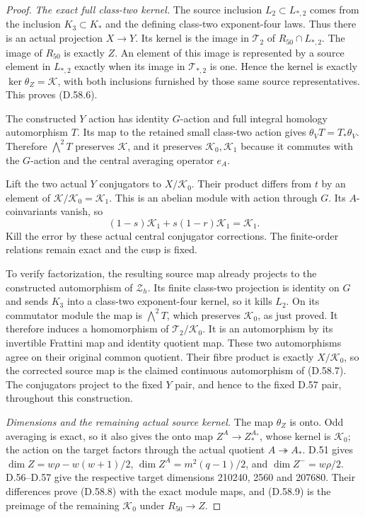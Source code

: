 \begin{proof}
\emph{The exact full class-two kernel.}
The source inclusion \(L_2\subset L_{*,2}\)
comes from the inclusion \(K_3\subset K_*\)
and the defining class-two exponent-four laws.
Thus there is an actual projection \(X\to Y\).
Its kernel is the image in \(\mathcal T_2\)
of \(R_{50}\cap L_{*,2}\). The image of
\(R_{50}\) is exactly \(Z\). An element of
this image is represented by a source element
in \(L_{*,2}\) exactly when its image in
\(\mathcal T_{*,2}\) is one. Hence the kernel
is exactly \(\ker\theta_Z=\mathcal K\), with
both inclusions furnished by those same
source representatives. This proves (D.58.6).

The constructed \(Y\) action has identity
\(G\)-action and full integral homology
automorphism \(T\). Its map to the retained
small class-two action gives
\(\theta_VT=T_*\theta_V\). Therefore
\(\bigwedge^2T\) preserves \(\mathcal K\),
and it preserves \(\mathcal K_0,\mathcal K_1\)
because it commutes with the \(G\)-action
and the central averaging operator \(e_A\).

Lift the two actual \(Y\) conjugators to
\(X/\mathcal K_0\). Their product differs
from \(t\) by an element of
\(\mathcal K/\mathcal K_0=\mathcal K_1\).
This is an abelian module with action through
\(G\). Its \(A\)-coinvariants vanish, so
\[
 (1-s)\mathcal K_1+s(1-r)\mathcal K_1
                         =\mathcal K_1.
 \tag{D.58.17}
\]
Kill the error by these actual central
conjugator corrections. The finite-order
relations remain exact and the cusp is fixed.

To verify factorization, the resulting source
map already projects to the constructed
automorphism of \(\mathcal Z_h\). Its finite
class-two projection is identity on \(G\)
and sends \(K_3\) into a class-two
exponent-four kernel, so it kills \(L_2\).
On its commutator module the map is
\(\bigwedge^2T\), which preserves
\(\mathcal K_0\), as just proved. It
therefore induces a homomorphism of
\(\mathcal T_2/\mathcal K_0\).
It is an automorphism by its invertible
Frattini map and identity quotient map.
These two automorphisms agree on their
original common quotient. Their fibre
product is exactly \(X/\mathcal K_0\),
so the corrected source map is the claimed
continuous automorphism of (D.58.7).
The conjugators project to the fixed
\(Y\) pair, and hence to the fixed D.57
pair, throughout this construction.

\emph{Dimensions and the remaining actual source kernel.}
The map \(\theta_Z\) is onto. Odd averaging
is exact, so it also gives the onto map
\(Z^A\to Z_*^{A_*}\), whose kernel is
\(\mathcal K_0\); the action on the target
factors through the actual quotient
\(A\twoheadrightarrow A_*\).
D.51 gives
\(\dim Z=w\rho-w(w+1)/2\),
\(\dim Z^A=m^2(q-1)/2\), and
\(\dim Z^-=w\rho/2\).
D.56--D.57 give the respective target
dimensions 210240, 2560 and 207680.
Their differences prove (D.58.8) with
the exact module maps, and (D.58.9)
is the preimage of the remaining
\(\mathcal K_0\) under \(R_{50}\to Z\).


\end{proof}
